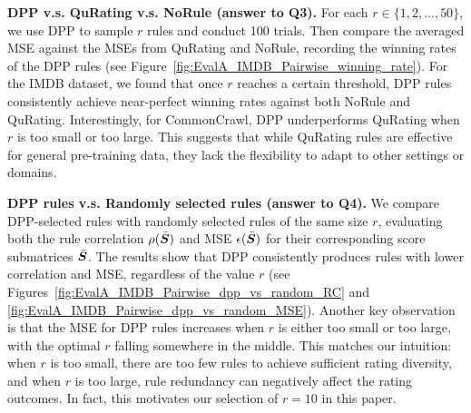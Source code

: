 \documentclass{article}
\newcommand{\bmS}{\bar{\mS}}
\begin{document}
\textbf{DPP v.s. QuRating v.s. NoRule (answer to \textbf{Q3}).} For each $r \in \{1, 2, \dots, 50\}$, we use DPP to sample $r$ rules and conduct 100 trials. Then compare the averaged MSE against the MSEs from QuRating and NoRule, recording the winning rates of the DPP rules (see Figure~\ref{fig:EvalA_IMDB_Pairwise_winning_rate}). For the IMDB dataset, we found that once $r$ reaches a certain threshold, DPP rules consistently achieve near-perfect winning rates against both NoRule and QuRating. Interestingly, for CommonCrawl, DPP underperforms QuRating when $r$ is too small or too large. This suggests that while QuRating rules are effective for general pre-training data, they lack the flexibility to adapt to other settings or domains.

\textbf{DPP rules v.s. Randomly selected rules (answer to \textbf{Q4}).} We compare DPP-selected rules with randomly selected rules of the same size $r$, evaluating both the rule correlation $\rho(\bmS)$ and MSE $\epsilon(\bmS)$ for their corresponding score submatrices $\bmS$. The results show that DPP consistently produces rules with lower correlation and MSE, regardless of the value $r$ (see Figures~\ref{fig:EvalA_IMDB_Pairwise_dpp_vs_random_RC} and \ref{fig:EvalA_IMDB_Pairwise_dpp_vs_random_MSE}). Another key observation is that the MSE for DPP rules increases when $r$ is either too small or too large, with the optimal $r$ falling somewhere in the middle. This matches our intuition: when $r$ is too small, there are too few rules to achieve sufficient rating diversity, and when $r$ is too large, rule redundancy can negatively affect the rating outcomes. In fact, this motivates our selection of $r=10$ in this paper.
\end{document}
